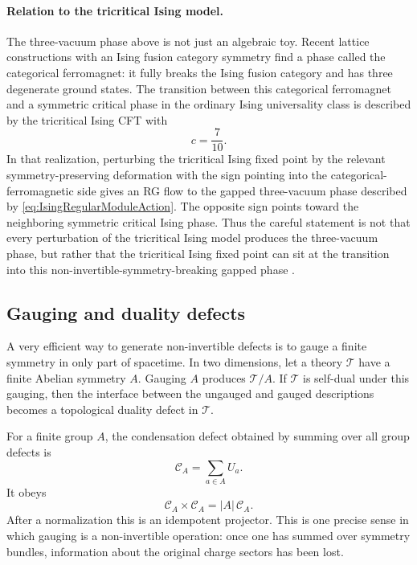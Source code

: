 \documentclass[11pt]{article}
\newcommand{\cC}{\mathcal{C}}
\begin{document}
\paragraph{Relation to the tricritical Ising model.}
The three-vacuum phase above is not just an algebraic toy.  Recent lattice constructions with an Ising fusion category symmetry find a phase called the categorical ferromagnet: it fully breaks the Ising fusion category and has three degenerate ground states.  The transition between this categorical ferromagnet and a symmetric critical phase in the ordinary Ising universality class is described by the tricritical Ising CFT with
\begin{equation}
  c=\frac{7}{10} .
\end{equation}
In that realization, perturbing the tricritical Ising fixed point by the relevant symmetry-preserving deformation with the sign pointing into the categorical-ferromagnetic side gives an RG flow to the gapped three-vacuum phase described by \eqref{eq:IsingRegularModuleAction}.  The opposite sign points toward the neighboring symmetric critical Ising phase.  Thus the careful statement is not that every perturbation of the tricritical Ising model produces the three-vacuum phase, but rather that the tricritical Ising fixed point can sit at the transition into this non-invertible-symmetry-breaking gapped phase \cite{BhardwajGappedPhases,RoychowdhuryWangIsingFusion}.


\subsection{Gauging and duality defects}

A very efficient way to generate non-invertible defects is to gauge a finite symmetry in only part of spacetime.  In two dimensions, let a theory $\mathcal T$ have a finite Abelian symmetry $A$.  Gauging $A$ produces $\mathcal T/A$.  If $\mathcal T$ is self-dual under this gauging, then the interface between the ungauged and gauged descriptions becomes a topological duality defect in $\mathcal T$.

For a finite group $A$, the condensation defect obtained by summing over all group defects is
\begin{equation}
  \cC_A=\sum_{a\in A} U_a .
\end{equation}
It obeys
\begin{equation}
  \cC_A\times\cC_A=|A|\,\cC_A .
\end{equation}
After a normalization this is an idempotent projector.  This is one precise sense in which gauging is a non-invertible operation: once one has summed over symmetry bundles, information about the original charge sectors has been lost.
\end{document}
